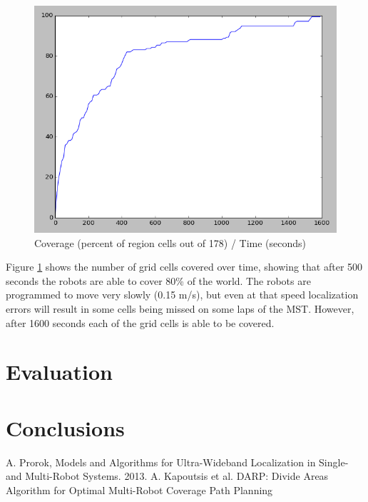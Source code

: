 \documentclass[a4paper, 10pt, conference]{ieeeconf}      %
\begin{document}
\begin{figure}
	\includegraphics[width=\columnwidth]{dec_t2_line_percent.png}
	\caption{Coverage (percent of region cells out of 178) / Time (seconds)}
    \label{fig:decLine}
\end{figure}

Figure \ref{fig:decLine} shows the number of grid cells covered over time, showing that after 500 seconds the robots are able to cover 80\% of the world. The robots are programmed to move very slowly (0.15 m/s), but even at that speed localization errors will result in some cells being missed on some laps of the MST. However, after 1600 seconds each of the grid cells is able to be covered.

\section{Evaluation}
\section{Conclusions}
\begin{thebibliography}{9}
 A. Prorok, Models and Algorithms for Ultra-Wideband Localization in Single- and Multi-Robot Systems. 2013.
 A. Kapoutsis et al. DARP: Divide Areas Algorithm for Optimal Multi-Robot Coverage Path Planning
\end{thebibliography}
\end{document}
